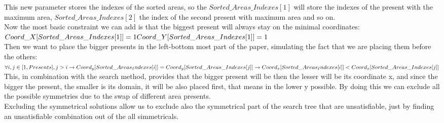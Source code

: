 This new parameter stores the indexes of the sorted areas, so the $Sorted\_Areas\_Indexes[1]$ will store the indexes of the present with
the maximum area, $Sorted\_Areas\_Indexes[2]$ the index of the second present with maximum area and so on.\\
Now the most basic constraint we can add is that the biggest present will always stay on the minimal coordinates:\\
$
Coord\_X[Sorted\_Areas\_Indexes[1]] = 1\\
Coord\_Y[Sorted\_Areas\_Indexes[1]] = 1
$
\\

Then we want to place the bigger presents in the left-bottom most part of the paper, simulating the fact that we are placing them before
the others:\\
$
\forall i, j \in [1, Presents], j > i \rightarrow \\
    Coord_y[Sorted\_Areas_Indexes[i]] = Coord_y[Sorted\_Areas\_Indexes[j]] \rightarrow \\
    Coord_x[Sorted\_Areas_Indexes[i]] < Coord_x[Sorted\_Areas\_Indexes[j]]
$
\\
This, in combination with the search method, provides that the bigger present will be then the lesser will be its coordinate x,
and since the bigger the present, the smaller is its domain, it will be also placed first, that means in the lower y possible.
By doing this we can exclude all the possible symmetries due to the swap of different area presents.\\
Excluding the symmetrical solutions allow us to exclude also the symmetrical part of the search tree that are unsatisfiable, just
by finding an unsatisfiable combination out of the all simmetricals.


